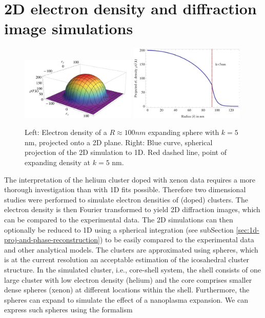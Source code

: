 \section{2D electron density and diffraction image simulations}\label{sec:2d-simulations}
\begin{figure}
	\centering
		\includegraphics[width=0.49\textwidth]{images/cluster-generation-2D.jpg}
		\includegraphics[width=0.49\textwidth]{images/cluster-generation-1D.png}
	\caption[Used electron densities in 2D real and Fourier space simulations.]{Left: Electron density of a $R\approx 100nm$ expanding sphere with $k=5$ nm, projected onto a 2D plane. Right: Blue curve, spherical projection of the 2D simulation to 1D. Red dashed line, point of expanding density at $k=5$ nm.}
	\label{fig:cluster-generation}
\end{figure}
The interpretation of the helium cluster doped with xenon data requires a more thorough investigation than with 1D fits possible. Therefore two dimensional studies were performed to simulate electron densities of (doped) clusters. The electron density is then Fourier transformed to yield 2D diffraction images, which can be compared to the experimental data. The 2D simulations can then optionally be reduced to 1D using a spherical integration (see subSection \ref{sec:1d-proj-and-phase-reconstruction}) to be easily compared to the experimental data and other analytical models. The clusters are approximated using spheres, which is at the current resolution an acceptable estimation of the icosahedral cluster structure. In the simulated cluster, i.e., core-shell system, the shell consists of one large cluster with low electron density (helium) and the core comprises smaller dense spheres (xenon) at different locations within the shell. Furthermore, the spheres can expand to simulate the effect of a nanoplasma expansion. We can express such spheres using the formalism

